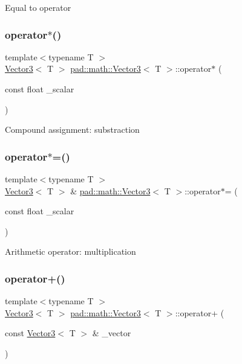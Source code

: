 Equal to operator \mbox{\label{structpad_1_1math_1_1_vector3_a25eb8201c257d3e10e280bb998892575}} 
\subsubsection{\texorpdfstring{operator$\ast$()}{operator*()}}
{\footnotesize\ttfamily template$<$typename T $>$ \\
\mbox{\hyperlink{structpad_1_1math_1_1_vector3}{Vector3}}$<$ T $>$ \mbox{\hyperlink{structpad_1_1math_1_1_vector3}{pad\+::math\+::\+Vector3}}$<$ T $>$\+::operator$\ast$ (\begin{DoxyParamCaption}\item[{const float}]{\+\_\+scalar }\end{DoxyParamCaption})}

Compound assignment\+: substraction \mbox{\label{structpad_1_1math_1_1_vector3_acfa17a2711cc9cc1bec80bf9a5b1c1ba}} 
\subsubsection{\texorpdfstring{operator$\ast$=()}{operator*=()}}
{\footnotesize\ttfamily template$<$typename T $>$ \\
\mbox{\hyperlink{structpad_1_1math_1_1_vector3}{Vector3}}$<$ T $>$ \& \mbox{\hyperlink{structpad_1_1math_1_1_vector3}{pad\+::math\+::\+Vector3}}$<$ T $>$\+::operator$\ast$= (\begin{DoxyParamCaption}\item[{const float}]{\+\_\+scalar }\end{DoxyParamCaption})}

Arithmetic operator\+: multiplication \mbox{\label{structpad_1_1math_1_1_vector3_a63632a298e724533cac1011dacff74b3}} 
\subsubsection{\texorpdfstring{operator+()}{operator+()}}
{\footnotesize\ttfamily template$<$typename T $>$ \\
\mbox{\hyperlink{structpad_1_1math_1_1_vector3}{Vector3}}$<$ T $>$ \mbox{\hyperlink{structpad_1_1math_1_1_vector3}{pad\+::math\+::\+Vector3}}$<$ T $>$\+::operator+ (\begin{DoxyParamCaption}\item[{const \mbox{\hyperlink{structpad_1_1math_1_1_vector3}{Vector3}}$<$ T $>$ \&}]{\+\_\+vector }\end{DoxyParamCaption})}

